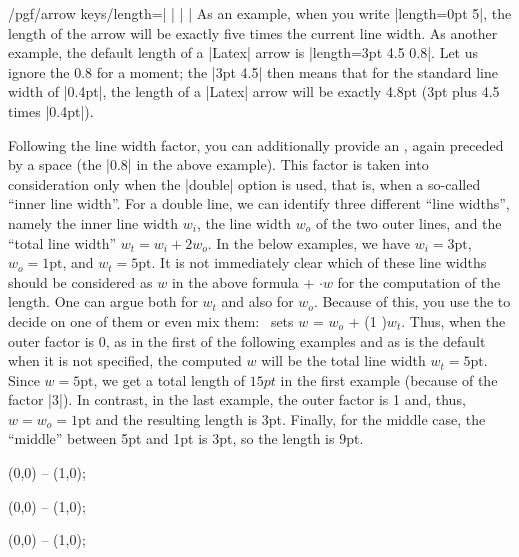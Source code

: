\begin{key}{/pgf/arrow keys/length=| |%
        | |}
    As an example, when you write |length=0pt 5|, the length of the arrow will
    be exactly five times the current line width. As another example, the
    default length of a |Latex| arrow is |length=3pt 4.5 0.8|. Let us ignore
    the 0.8 for a moment; the |3pt 4.5| then means that for the standard line
    width of |0.4pt|, the length of a |Latex| arrow will be exactly 4.8pt (3pt
    plus 4.5 times |0.4pt|).

    Following the line width factor, you can additionally provide an
    , again preceded by a space (the |0.8| in the above
    example). This factor is taken into consideration only when the |double|
    option is used, that is, when a so-called ``inner line width''. For a
    double line, we can identify three different ``line widths'', namely the
    inner line width $w_i$, the line width  $w_o$ of the two outer lines, and
    the ``total line width'' $w_t = w_i + 2w_o$. In the below examples, we have
    $w_i = 3\mathrm{pt}$, $w_o=1\mathrm{pt}$, and $w_t = 5\mathrm{pt}$. It is
    not immediately clear which of these line widths should be considered as
    $w$ in the above formula  +  $\cdot
    w$ for the computation of the length. One can argue both for $w_t$ and also
    for $w_o$. Because of this, you use the  to decide on
    one of them or even mix them: \tikzname\ sets $w$ =  $w_o$
    + (1 \textminus {})$w_t$. Thus, when the outer factor is $0$, as in
    the first of the following examples and as is the default when it is not
    specified, the computed $w$ will be the total line width $w_t =
    5\mathrm{pt}$. Since $w=5\mathrm{pt}$, we get a total length of $15pt$ in
    the first example (because of the factor |3|). In contrast, in the last
    example, the outer factor is 1 and, thus, $w = w_o = \mathrm{1pt}$ and the
    resulting length is 3pt. Finally, for the middle case, the ``middle''
    between 5pt and 1pt is 3pt, so the length is 9pt.
\begin{codeexample}[preamble={\usetikzlibrary{arrows.meta}}]
\tikz \draw [line width=1pt, double distance=3pt,
             arrows = {-Latex[length=0pt 3 0]}] (0,0) -- (1,0);
\end{codeexample}
\begin{codeexample}[preamble={\usetikzlibrary{arrows.meta}}]
\tikz \draw [line width=1pt, double distance=3pt,
             arrows = {-Latex[length=0pt 3 .5]}] (0,0) -- (1,0);
\end{codeexample}
\begin{codeexample}[preamble={\usetikzlibrary{arrows.meta}}]
\tikz \draw [line width=1pt, double distance=3pt,
             arrows = {-Latex[length=0pt 3 1]} ] (0,0) -- (1,0);
\end{codeexample}


\end{key}
